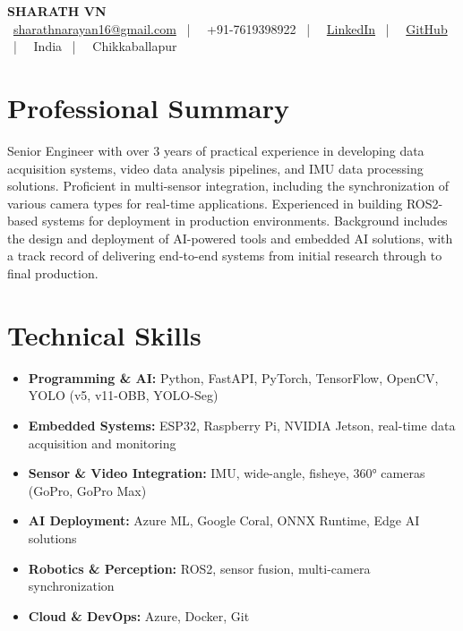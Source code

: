 \documentclass[a4paper,10pt]{article}
\begin{document}
\begin{center}
    {\LARGE \textbf{SHARATH VN}} \\
    \vspace{0.2cm}
    \small
    \faEnvelope\ \href{mailto:sharathnarayan16@gmail.com}{sharathnarayan16@gmail.com} \ | \
    \faPhone\ +91-7619398922 \ | \
    \faLinkedin\ \href{https://www.linkedin.com/in/sharath-vn-93160920b/}{LinkedIn} \ | \
    \faGithub\ \href{https://github.com/sharath56}{GitHub} \ | \
    \faFlag\ India \ | \ \faMapMarker*\ Chikkaballapur
\end{center}


\vspace{0.2cm}
\noindent\makebox[\linewidth]{\rule{\textwidth}{0.4pt}}



\vspace{0.5cm}

\section*{Professional Summary}
Senior Engineer with over 3 years of practical experience in developing data acquisition systems, video data analysis pipelines, and IMU data processing solutions. Proficient in multi-sensor integration, including the synchronization of various camera types for real-time applications. Experienced in building ROS2-based systems for deployment in production environments. Background includes the design and deployment of AI-powered tools and embedded AI solutions, with a track record of delivering end-to-end systems from initial research through to final production.

\vspace{0.3cm}

\section*{Technical Skills}
\begin{itemize}[leftmargin=1.5em]
    \item \textbf{Programming \& AI:} Python, FastAPI, PyTorch, TensorFlow, OpenCV, YOLO (v5, v11-OBB, YOLO-Seg)
    \item \textbf{Embedded Systems:} ESP32, Raspberry Pi, NVIDIA Jetson, real-time data acquisition and monitoring
    \item \textbf{Sensor \& Video Integration:} IMU, wide-angle, fisheye, 360° cameras (GoPro, GoPro Max)
    \item \textbf{AI Deployment:} Azure ML, Google Coral, ONNX Runtime, Edge AI solutions
    \item \textbf{Robotics \& Perception:} ROS2, sensor fusion, multi-camera synchronization
    \item \textbf{Cloud \& DevOps:} Azure, Docker, Git
\end{itemize}
\end{document}
